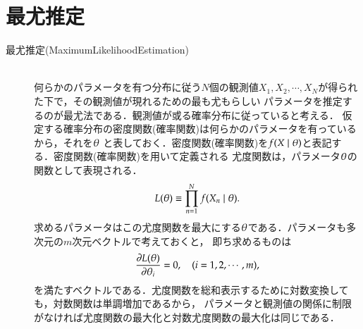 \documentclass[a4j,papersize,disablejfam,slide,14pt]{jsarticle}
\def\Vector#1{{\boldmath #1}} %
\begin{document}
\section{最尤推定}
	\begin{description}
    	\item[最尤推定({\rm Maximum\quad Likelihood\quad Estimation})]\mbox{}\\
        	何らかのパラメータを有つ分布に従う$N$個の観測値$X_1, X_2, \cdots, X_N$が得られた下で，その観測値が現れるための最も尤もらしい
            パラメータを推定するのが最尤法である．観測値が或る確率分布に従っていると考える．
            仮定する確率分布の密度関数(確率関数)は何らかのパラメータを有っているから，それを$\Vector{\theta}$
            と表しておく．密度関数(確率関数)を$f(X \mid \Vector{\theta})$と表記する．密度関数(確率関数)を用いて定義される
            尤度関数は，パラメータ$\Vector{\theta}$の関数として表現される．
            \begin{align}
            	L(\Vector{\theta}) \equiv \prod_{n=1}^{N} f(X_n \mid \Vector{\theta}).
            \end{align}
            求めるパラメータはこの尤度関数を最大にする$\Vector{\theta}$である．パラメータも多次元の$m$次元ベクトルで考えておくと，
            即ち求めるものは
            \begin{align}
            	\frac{\partial L(\Vector{\theta})}{\partial \theta_i} = 0, \quad (i = 1, 2, \cdots, m),
            \end{align}
            を満たすベクトルである．尤度関数を総和表示するために対数変換しても，対数関数は単調増加であるから，
            パラメータと観測値の関係に制限がなければ尤度関数の最大化と対数尤度関数の最大化は同じである．
    \end{description}
\end{document}
